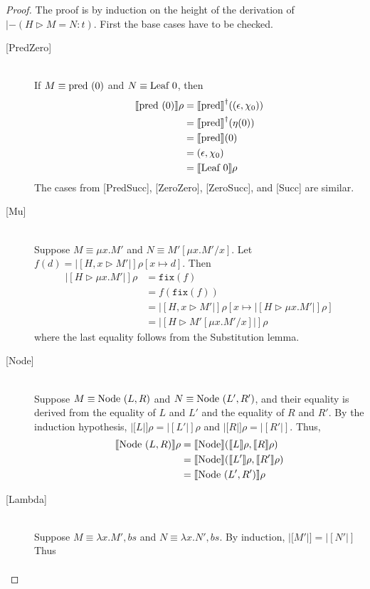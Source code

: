 \begin{proof}
The proof is by induction on the height of the derivation of 
$|-(H \triangleright M = N:t)$.  First the base cases have to be checked. 
\begin{description}
\item[{[}PredZero{]}] \hfill \\ 
If $M\equiv \textrm{pred }(0)$ and $N\equiv \textrm{Leaf } 0$, then 
\begin{align*}
|[\textrm{pred }(0)|]\rho &= |[\textrm{pred }\!\!|]^{\dagger}((\epsilon, \chi_0)) \\
&= |[\textrm{pred }\!\!|]^{\dagger}(\eta(0)) \\
&= |[\textrm{pred }\!\!|](0) \\
&= (\epsilon, \chi_0) \\
&= |[\textrm{Leaf } 0|]\rho
\end{align*}
The cases from [PredSucc], [ZeroZero], [ZeroSucc], and [Succ] are similar.
\newpage  
\item[{[}Mu{]}] \hfill \\ 
Suppose $M\equiv \mu x.M'$ and $N\equiv M'[\mu x.M'/x]$.  
Let $f(d) = |[H,x\triangleright M'|]\rho[x\mapsto d]$.  Then
\begin{align*}
|[H\triangleright \mu x.M'|]\rho &= \texttt{fix}(f) \\
&= f(\texttt{fix}(f)) \\
&= |[H,x\triangleright M'|]\rho[x\mapsto |[H\triangleright \mu x.M'|]\rho] \\ 
&= |[H\triangleright M'[\mu x.M'/x]|]\rho
\end{align*}
where the last equality follows from the Substitution lemma. 
\item[{[}Node{]}] \hfill \\ 
Suppose $M\equiv \textrm{Node }(L,R)$ and $N\equiv \textrm{Node }(L',R')$, and their equality is derived from the equality of $L$ and $L'$ and the equality of $R$ and $R'$.  By the induction hypothesis, 
$|[L|]\rho = |[L'|]\rho$ and $|[R|]\rho = |[R'|]$.  Thus,
\begin{align*}
|[\textrm{Node }(L,R)|]\rho &= |[\textrm{Node }\!\!|](|[L|]\rho, |[R|]\rho) \\
&= |[\textrm{Node }\!\!|](|[L'|]\rho, |[R'|]\rho) \\
&= |[\textrm{Node }(L',R')|]\rho
\end{align*}
\item[{[}Lambda{]}] \hfill \\ 
Suppose $M\equiv \lambda x.M', bs$ and $N\equiv \lambda x.N', bs$.  By induction, $|[M'|] = |[N'|]$  Thus
\begin{align*}

\end{align*}
\end{description}
\end{proof}
